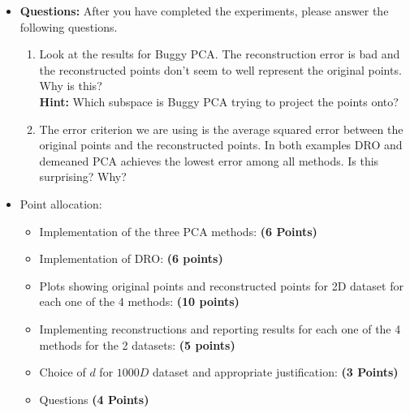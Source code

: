 \documentclass[a4paper]{article}
\theoremstyle{definition}
\begin{document}
\begin{itemize}
\item \textbf{Questions:} After you have completed the experiments, please answer the following questions.
\begin{enumerate}
\item Look at the results for Buggy PCA. The reconstruction error is bad and the
reconstructed points don't seem to well represent the original points. Why is
this? \\
\textbf{Hint: } Which subspace is Buggy PCA trying to project the points
onto?
\item The error criterion we are using is the average squared error 
between the original points and the reconstructed points.
In both examples DRO and demeaned PCA achieves the lowest error among all
methods. 
Is this surprising? Why?
\end{enumerate}

\item Point allocation:
\begin{itemize}
\item Implementation of the three PCA methods: \textbf{(6 Points)}
\item Implementation of DRO: \textbf{(6 points)}
\item Plots showing original points and reconstructed points for 2D dataset for each one of the 4 methods: \textbf{(10 points)}
\item Implementing reconstructions and reporting results for each one of the 4 methods for the 2 datasets: \textbf{(5 points)}
\item Choice of $d$ for $1000D$ dataset and appropriate justification:
\textbf{(3 Points)}
\item Questions \textbf{(4 Points)}
\end{itemize}

\end{itemize}



\vspace{0.2in}
\end{document}

